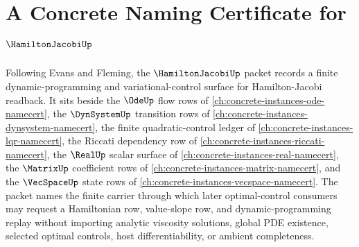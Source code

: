 \chapter{A Concrete Naming Certificate for $\HamiltonJacobiUp$}
\label{ch:concrete-instances-hamilton-jacobi-namecert}

Following Evans and Fleming, the $\HamiltonJacobiUp$ packet records a finite dynamic-programming and variational-control surface for Hamilton-Jacobi readback. It sits beside the $\OdeUp$ flow rows of \autoref{ch:concrete-instances-ode-namecert}, the $\DynSystemUp$ transition rows of \autoref{ch:concrete-instances-dynsystem-namecert}, the finite quadratic-control ledger of \autoref{ch:concrete-instances-lqr-namecert}, the Riccati dependency row of \autoref{ch:concrete-instances-riccati-namecert}, the $\RealUp$ scalar surface of \autoref{ch:concrete-instances-real-namecert}, the $\MatrixUp$ coefficient rows of \autoref{ch:concrete-instances-matrix-namecert}, and the $\VecSpaceUp$ state rows of \autoref{ch:concrete-instances-vecspace-namecert}. The packet names the finite carrier through which later optimal-control consumers may request a Hamiltonian row, value-slope row, and dynamic-programming replay without importing analytic viscosity solutions, global PDE existence, selected optimal controls, host differentiability, or ambient completeness.

